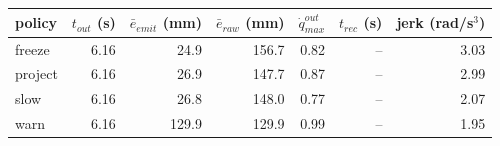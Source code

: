 \begin{tabular}{lrrrrrr}
\toprule
policy & $t_{out}$ (s) & $\bar{e}_{emit}$ (mm) & $\bar{e}_{raw}$ (mm) & $\dot{q}_{max}^{out}$ & $t_{rec}$ (s) & jerk (rad/s$^3$) \\
\midrule
freeze & 6.16 & 24.9 & 156.7 & 0.82 & -- & 3.03 \\
project & 6.16 & 26.9 & 147.7 & 0.87 & -- & 2.99 \\
slow & 6.16 & 26.8 & 148.0 & 0.77 & -- & 2.07 \\
warn & 6.16 & 129.9 & 129.9 & 0.99 & -- & 1.95 \\
\bottomrule
\end{tabular}

